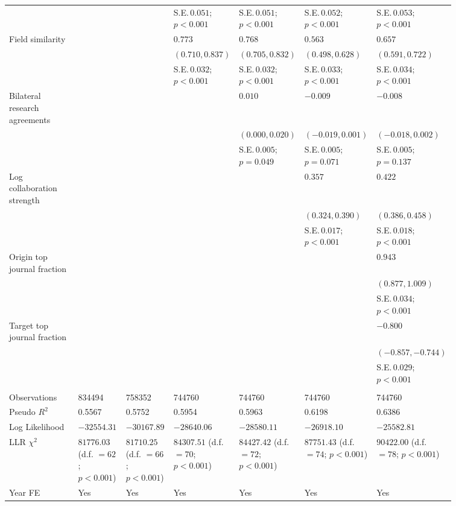 \begin{table}[H]
{\begin{tabular}{p{0.2\linewidth}p{0.11\linewidth}p{0.11\linewidth}p{0.11\linewidth}p{0.11\linewidth}p{0.11\linewidth}p{0.11\linewidth}}
 &  &  & S.E.\,$0.051$; ${p < 0.001}$ & S.E.\,$0.051$; ${p < 0.001}$ & S.E.\,$0.052$; ${p < 0.001}$ & S.E.\,$0.053$; ${p < 0.001}$\\ [0.8ex]  
Field similarity &  &  & $0.773$ & $0.768$ & $0.563$ & $0.657$\\ 
 &  &  & $(0.710, 0.837)$ & $(0.705, 0.832)$ & $(0.498, 0.628)$ & $(0.591, 0.722)$\\ 
 &  &  & S.E.\,$0.032$; ${p < 0.001}$ & S.E.\,$0.032$; ${p < 0.001}$ & S.E.\,$0.033$; ${p < 0.001}$ & S.E.\,$0.034$; ${p < 0.001}$\\ [0.8ex]  
Bilateral research agreements &  &  &  & $0.010$ & $-0.009$ & $-0.008$\\ 
 &  &  &  & $(0.000, 0.020)$ & $(-0.019, 0.001)$ & $(-0.018, 0.002)$\\ 
 &  &  &  & S.E.\,$0.005$; ${p = 0.049}$ & S.E.\,$0.005$; ${p = 0.071}$ & S.E.\,$0.005$; ${p = 0.137}$\\ [0.8ex]  
Log collaboration strength &  &  &  &  & $0.357$ & $0.422$\\ 
 &  &  &  &  & $(0.324, 0.390)$ & $(0.386, 0.458)$\\ 
 &  &  &  &  & S.E.\,$0.017$; ${p < 0.001}$ & S.E.\,$0.018$; ${p < 0.001}$\\ [0.8ex]  
Origin top journal fraction &  &  &  &  &  & $0.943$\\ 
 &  &  &  &  &  & $(0.877, 1.009)$\\ 
 &  &  &  &  &  & S.E.\,$0.034$; ${p < 0.001}$\\ [0.8ex]  
Target top journal fraction &  &  &  &  &  & $-0.800$\\ 
 &  &  &  &  &  & $(-0.857, -0.744)$\\ 
 &  &  &  &  &  & S.E.\,$0.029$; ${p < 0.001}$\\ [0.8ex]  
\hline 
\hline \\[-1.8ex] 
Observations & 834494 & 758352 & 744760 & 744760 & 744760 & 744760 \\ 
Pseudo $R^2$ & 0.5567 & 0.5752 & 0.5954 & 0.5963 & 0.6198 & 0.6386 \\ 
Log Likelihood & $-32554.31$ & $-30167.89$ & $-28640.06$ & $-28580.11$ & $-26918.10$ & $-25582.81$ \\ 
LLR $\chi^2$  & $81776.03$ (d.f. $= 62$; ${p < 0.001}$) & $81710.25$ (d.f. $= 66$; ${p < 0.001}$) & $84307.51$ (d.f. $= 70$; ${p < 0.001}$) & $84427.42$ (d.f. $= 72$; ${p < 0.001}$) & $87751.43$ (d.f. $= 74$; ${p < 0.001}$) & $90422.00$ (d.f. $= 78$; ${p < 0.001}$) \\ 
Year FE  & Yes & Yes & Yes & Yes & Yes & Yes \\ 
\hline 
\end{tabular}
}
\end{table}

